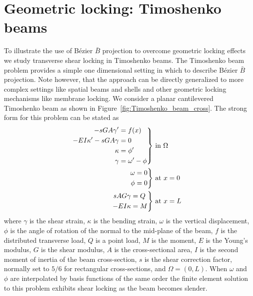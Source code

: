 \documentclass{article}
\newenvironment{rcases}
  {\left.\begin{aligned}}
  {\end{aligned}\right\rbrace}
\newcommand{\Bezier}{{B\'{e}zier} }
\begin{document}
\section{Geometric locking: Timoshenko beams}
\label{sec:timoshenkobeam}
To illustrate the use of \Bezier $\bar{B}$ projection to overcome geometric locking effects we study transverse shear locking in Timoshenko beams. The Timoshenko beam problem provides a simple one dimensional setting in which to describe B\'ezier $\bar{B}$ projection. Note however, that the approach can be directly generalized to more complex settings like spatial beams and shells and other geometric locking mechanisms like membrane locking. We consider a planar cantilevered Timoshenko beam as shown in Figure~\ref{fig:Timoshenko_beam_cross}. The strong form for this problem can be stated as
\begin{align}
\begin{rcases}
\begin{aligned}
  -s{GA}\gamma' &=f(x) \\
  -EI\kappa'-s{GA}\gamma &= 0\\
  \kappa &= \phi' \\
  \gamma &= \omega'-\phi
\end{aligned}
\end{rcases}
& \text{ in $\Omega$}\\
\begin{rcases}
\begin{aligned}
\omega&=0\\
\phi&=0
\end{aligned}
\end{rcases}
&\text{ at $x=0$}\\
\begin{rcases}
\begin{aligned}
s{AG}\gamma &= Q\\
-EI\kappa &= M
\end{aligned}
\end{rcases}
&\text{ at $x=L$}
\end{align}
where $\gamma$ is the shear strain, $\kappa$ is the bending strain, $\omega$ is the vertical displacement, $\phi$ is the angle of rotation of the normal to the mid-plane of the beam, $f$ is the distributed transverse load, $Q$ is a point load, $M$ is the moment, $E$ is the Young's modulus, $G$ is the shear modulus, $A$ is the cross-sectional area, $I$ is the second moment of inertia of the beam cross-section, $s$ is the shear correction factor, normally set to $5/6$ for rectangular cross-sections, and $\Omega = (0,L)$. When $\omega$ and $\phi$ are interpolated by basis functions of the same order the finite element solution to this problem exhibits shear locking as the beam becomes slender.
\end{document}
